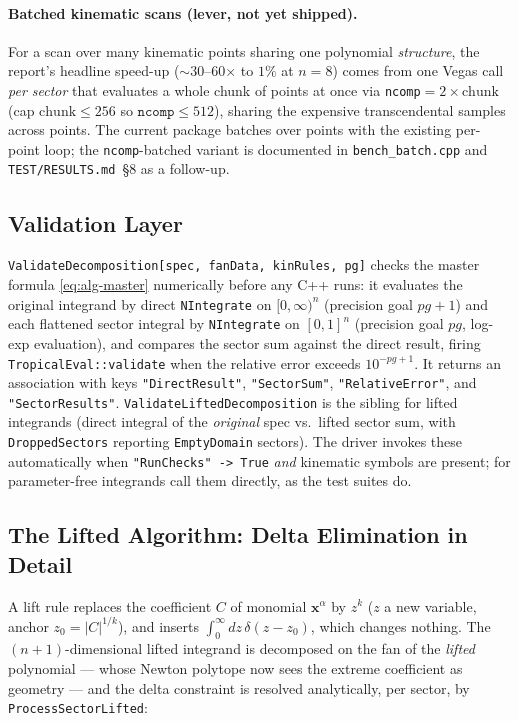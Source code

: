 \documentclass[11pt,a4paper]{article}
\begin{document}
\paragraph{Batched kinematic scans (lever, not yet shipped).} For a scan over
many kinematic points sharing one polynomial \emph{structure}, the report's
headline speed-up ($\sim$30--60$\times$ to $1\%$ at $n=8$) comes from one Vegas
call \emph{per sector} that evaluates a whole chunk of points at once via
\texttt{ncomp}${}=2\times\text{chunk}$ (cap $\text{chunk}\le256$ so
$\texttt{ncomp}\le512$), sharing the expensive transcendental samples across
points. The current package batches over points with the existing per-point
loop; the \texttt{ncomp}-batched variant is documented in
\texttt{bench\_batch.cpp} and \texttt{TEST/RESULTS.md}~\S8 as a follow-up.

\subsection{Validation Layer}\label{sec:alg-validation}

\texttt{ValidateDecomposition[spec, fanData, kinRules, pg]} checks the master
formula \eqref{eq:alg-master} numerically before any C++ runs: it evaluates
the original integrand by direct \texttt{NIntegrate} on $[0,\infty)^n$
(precision goal $pg+1$) and each flattened sector integral by
\texttt{NIntegrate} on $[0,1]^n$ (precision goal $pg$, log-exp evaluation),
and compares the sector sum against the direct result, firing
\texttt{TropicalEval::validate} when the relative error exceeds
$10^{-pg+1}$. It returns an association with keys \texttt{"DirectResult"},
\texttt{"SectorSum"}, \texttt{"RelativeError"}, and \texttt{"SectorResults"}.
\texttt{ValidateLiftedDecomposition} is
the sibling for lifted integrands (direct integral of the \emph{original}
spec vs.\ lifted sector sum, with \texttt{DroppedSectors} reporting
\texttt{EmptyDomain} sectors). The driver invokes these automatically when
\texttt{"RunChecks" -> True} \emph{and} kinematic symbols are present; for
parameter-free integrands call them directly, as the test suites do.

\subsection{The Lifted Algorithm: Delta Elimination in Detail}\label{sec:delta}

A lift rule replaces the coefficient $C$ of monomial $\mathbf{x}^\alpha$ by
$z^k$ ($z$ a new variable, anchor $z_0 = |C|^{1/k}$), and inserts
$\int_0^\infty dz\,\delta(z - z_0)$, which changes nothing. The
$(n{+}1)$-dimensional lifted integrand is decomposed on the fan of the
\emph{lifted} polynomial --- whose Newton polytope now sees the extreme
coefficient as geometry --- and the delta constraint is resolved
analytically, per sector, by \texttt{ProcessSectorLifted}:
\end{document}
